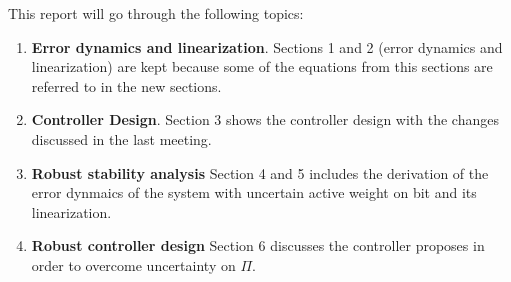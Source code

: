 \documentclass[main.tex]{subfiles}
\begin{document}
	
This report will go through the following topics:

\begin{enumerate}
	\item \textbf{Error dynamics and linearization}. Sections 1 and 2 (error dynamics and linearization) are kept because some of the equations from this sections are referred to in the  new sections.
	\item \textbf{Controller Design}. Section 3 shows the controller design with the changes discussed in the last meeting.
	\item \textbf{Robust stability analysis} Section 4 and 5 includes the derivation of the error dynmaics of the system with uncertain active weight on bit and its linearization.
	\item \textbf{Robust controller design} Section 6 discusses the controller proposes in order to overcome uncertainty on $\Pi$.
\end{enumerate}
\end{document}
